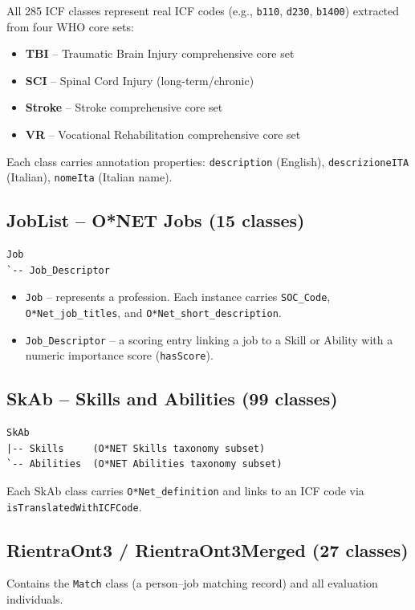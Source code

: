 ﻿\documentclass[12pt,a4paper]{article}
\begin{document}
All 285 ICF classes represent real ICF codes (e.g., \texttt{b110}, \texttt{d230}, \texttt{b1400}) extracted from four WHO core sets:
\begin{itemize}
  \item \textbf{TBI} -- Traumatic Brain Injury comprehensive core set
  \item \textbf{SCI} -- Spinal Cord Injury (long-term/chronic)
  \item \textbf{Stroke} -- Stroke comprehensive core set
  \item \textbf{VR} -- Vocational Rehabilitation comprehensive core set
\end{itemize}

Each class carries annotation properties: \texttt{description} (English), \texttt{descrizioneITA} (Italian), \texttt{nomeIta} (Italian name).

\subsection{JobList -- O*NET Jobs (15 classes)}
\begin{lstlisting}
Job
`-- Job_Descriptor
\end{lstlisting}
\begin{itemize}
  \item \texttt{Job} -- represents a profession. Each instance carries \texttt{SOC\_Code}, \texttt{O*Net\_job\_titles}, and \texttt{O*Net\_short\_description}.
  \item \texttt{Job\_Descriptor} -- a scoring entry linking a job to a Skill or Ability with a numeric importance score (\texttt{hasScore}).
\end{itemize}

\subsection{SkAb -- Skills and Abilities (99 classes)}
\begin{lstlisting}
SkAb
|-- Skills     (O*NET Skills taxonomy subset)
`-- Abilities  (O*NET Abilities taxonomy subset)
\end{lstlisting}
Each SkAb class carries \texttt{O*Net\_definition} and links to an ICF code via \texttt{isTranslatedWithICFCode}.

\subsection{RientraOnt3 / RientraOnt3Merged (27 classes)}
Contains the \texttt{Match} class (a person--job matching record) and all evaluation individuals.
\end{document}
